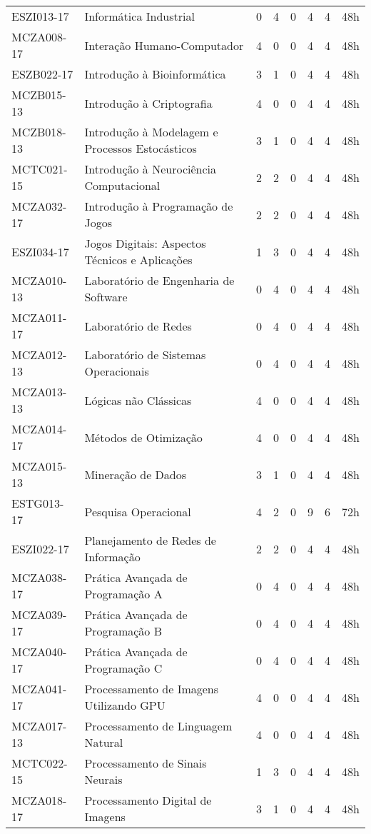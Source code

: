 \documentclass[a4paper]{article}
\begin{document}
\begin{longtable}{|l|l|llll|l|l|}
ESZI013-17 & Informática Industrial & 0 & 4 & 0 & 4 & 4 & 48h \\
MCZA008-17 & Interação Humano-Computador & 4 & 0 & 0 & 4 & 4 & 48h \\
ESZB022-17 & Introdução à Bioinformática & 3 & 1 & 0 & 4 & 4 & 48h \\
MCZB015-13 & Introdução à Criptografia & 4 & 0 & 0 & 4 & 4 & 48h \\
MCZB018-13 & Introdução à Modelagem e Processos Estocásticos & 3 & 1 & 0 & 4 & 4 & 48h \\
MCTC021-15 & Introdução à Neurociência Computacional & 2 & 2 & 0 & 4 & 4 & 48h \\
MCZA032-17 & Introdução à Programação de Jogos & 2 & 2 & 0 & 4 & 4 & 48h \\
ESZI034-17 & Jogos Digitais: Aspectos Técnicos e Aplicações & 1 & 3 & 0 & 4 & 4 & 48h \\
MCZA010-13 & Laboratório de Engenharia de Software & 0 & 4 & 0 & 4 & 4 & 48h \\
MCZA011-17 & Laboratório de Redes & 0 & 4 & 0 & 4 & 4 & 48h \\
MCZA012-13 & Laboratório de Sistemas Operacionais & 0 & 4 & 0 & 4 & 4 & 48h \\
MCZA013-13 & Lógicas não Clássicas & 4 & 0 & 0 & 4 & 4 & 48h \\
MCZA014-17 & Métodos de Otimização & 4 & 0 & 0 & 4 & 4 & 48h \\
MCZA015-13 & Mineração de Dados & 3 & 1 & 0 & 4 & 4 & 48h \\
ESTG013-17 & Pesquisa Operacional & 4 & 2 & 0 & 9 & 6 & 72h \\
ESZI022-17 & Planejamento de Redes de Informação & 2 & 2 & 0 & 4 & 4 & 48h \\
MCZA038-17 & Prática Avançada de Programação A & 0 & 4 & 0 & 4 & 4 & 48h \\
MCZA039-17 & Prática Avançada de Programação B & 0 & 4 & 0 & 4 & 4 & 48h \\
MCZA040-17 & Prática Avançada de Programação C & 0 & 4 & 0 & 4 & 4 & 48h \\
MCZA041-17 & Processamento de Imagens Utilizando GPU & 4 & 0 & 0 & 4 & 4 & 48h \\
MCZA017-13 & Processamento de Linguagem Natural & 4 & 0 & 0 & 4 & 4 & 48h \\
MCTC022-15 & Processamento de Sinais Neurais & 1 & 3 & 0 & 4 & 4 & 48h \\
MCZA018-17 & Processamento Digital de Imagens & 3 & 1 & 0 & 4 & 4 & 48h \\

\end{longtable}
\end{document}
